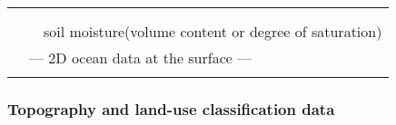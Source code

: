 \begin{table}[tb]
\begin{center}
\begin{tabularx}{150mm}{llX}
    & &  \multicolumn{1}{l}{\color{blue}{surface skin temperature}}\\
    & &  \multicolumn{1}{l}{{\color{blue}{information of depth of soil data in the parent model, soil temperature,}}}\\
    & &  \multicolumn{1}{l}{{{soil moisture(volume content or degree of saturation)}}}\\
    &  \multicolumn{2}{l}{--- 2D ocean data at the surface ---}\\
    & &  \multicolumn{1}{l}{\color{blue}{sea surface temperature (omitted if skin temperature is also used for SST)}}\\ \hline
  \end{tabularx}
\end{center}
\end{table}


\subsubsection{Topography and land-use classification data}

